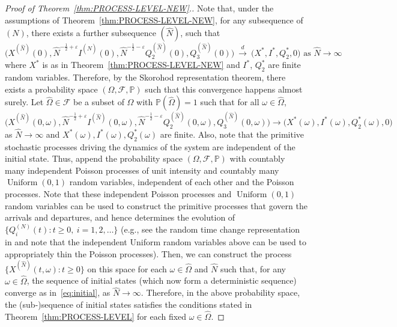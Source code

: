 \documentclass[11pt, reqno]{article}
\numberwithin{equation}{section}
\numberwithin{theorem}{section}
\newcommand\blue[1]{#1}
\newcommand{\dto}{\ensuremath{\ \xrightarrow{d} \ }}  %
\begin{document}
\blue{\begin{proof}[Proof of Theorem~\ref{thm:PROCESS-LEVEL-NEW}.]
Note that, under the assumptions of Theorem~\ref{thm:PROCESS-LEVEL-NEW}, for any subsequence of $(N)$, there exists a further subsequence $(\hat{N})$, such that 
$$\big(X^{(\hat{N})}(0), \hat{N}^{-\frac{1}{2}+\varepsilon}I^{(\hat{N})}(0), \hat{N}^{-\frac{1}{2}-\varepsilon}Q^{(\hat{N})}_2(0), Q^{(\hat{N})}_3(0)\big) \dto \big(X^*, I^*, Q^*_2, 0\big) \text{ as } \hat{N}\rightarrow\infty$$ 
where $X^*$ is as in Theorem~\ref{thm:PROCESS-LEVEL-NEW} and $I^*$, $Q^*_2$ are finite random variables.
Therefore, by the Skorohod representation theorem, there exists a probability space
$(\Omega, \mathcal{F},\mathbb{P})$ such that this convergence happens almost surely. 
Let $\hat{\Omega}\in \mathcal{F}$ be a subset of $\Omega$ with $\mathbb{P}(\hat{\Omega}) = 1$ such that for all $\omega\in \hat{\Omega}$, 
\begin{equation}\label{eq:initial}
\big(X^{(\hat{N})}(0, \omega), \hat{N}^{-\frac{1}{2}+\varepsilon} I^{(\hat{N})}(0, \omega), \hat{N}^{-\frac{1}{2}-\varepsilon} Q^{(\hat{N})}_2(0, \omega), Q^{(\hat{N})}_3(0, \omega)\big) \to \big(X^*(\omega), I^*(\omega), Q^*_2(\omega), 0\big)    
\end{equation}
as $\hat{N}\rightarrow\infty$
and $X^*(\omega), I^*(\omega), Q^*_2(\omega)$ are finite.
Also, note that the primitive stochastic processes driving the dynamics of the system are independent of the initial state.
Thus, append the probability space $(\Omega, \mathcal{F},\mathbb{P})$ with countably many independent Poisson processes of unit intensity and countably many $\operatorname{Uniform}(0,1)$ random variables, independent of each other and the Poisson processes. 
Note that these independent Poisson processes and $\operatorname{Uniform}(0,1)$ random variables can be used to construct the primitive processes that govern the arrivals and departures, and hence determines the evolution of $\{Q_i^{(N)}(t): t\ge 0,\ i=1,2,\ldots\}$ (e.g., see the random time change representation in \cite[Section 4.2]{EG15} and note that the independent Uniform random variables above can be used to appropriately thin the Poisson processes). 
Then, we can construct the process $\{X^{(\hat{N})}(t,\omega): t \ge 0\}$ on this space for each $\omega \in \hat{\Omega}$ and $\hat{N}$ such that, for any $\omega \in \hat{\Omega}$, the sequence of initial states (which now form a deterministic sequence) converge as in~\eqref{eq:initial}, as $\hat{N} \rightarrow \infty$.
Therefore, in the above probability space, the (sub-)sequence of initial states satisfies the conditions stated in Theorem~\ref{thm:PROCESS-LEVEL} for each fixed $\omega \in \hat{\Omega}$. 

\end{proof}}
\end{document}

